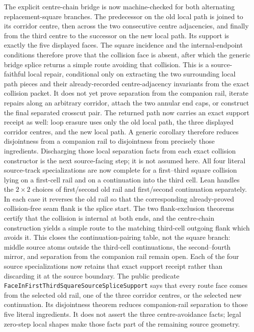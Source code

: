 \documentclass[11pt]{article}
\theoremstyle{definition}
\begin{document}
The explicit centre-chain bridge is now machine-checked for both alternating
replacement-square branches.  The predecessor on the old local path is joined
to its corridor centre, then across the two consecutive centre adjacencies,
and finally from the third centre to the successor on the new local path.  Its
support is exactly the five displayed faces.  The square incidence and the
internal-endpoint conditions therefore prove that the collision face is absent,
after which the generic bridge splice returns a simple route avoiding that
collision.  This is a source-faithful local repair, conditional only on
extracting the two surrounding local path pieces and their already-recorded
centre-adjacency invariants from the exact collision packet.  It does not yet
prove separation from the companion rail, iterate repairs along an arbitrary
corridor, attach the two annular end caps, or construct the final separated
crosscut pair.
The returned path now carries an exact support receipt as well: loop erasure
uses only the old local path, the three displayed corridor centres, and the new
local path.  A generic corollary therefore reduces disjointness from a companion
rail to disjointness from precisely those ingredients.  Discharging those
local separation facts from each exact collision constructor is the next
source-facing step; it is not assumed here.
All four literal source-track specializations are now complete for a
first--third square collision lying on a first-cell rail and on a continuation
into the third cell.  Lean handles the $2\times2$ choices of first/second old
rail and first/second continuation separately.  In each case it reverses the
old rail so that the corresponding already-proved collision-free seam flank is
the splice start.  The two flank-exclusion theorems certify that the collision
is internal at both ends, and the centre-chain construction yields a simple
route to the matching third-cell outgoing flank which avoids it.  This closes
the continuation-pairing table, not the square branch: middle source atoms
outside the third-cell continuations, the second--fourth mirror, and separation
from the companion rail remain open.
Each of the four source specializations now retains that exact support receipt
rather than discarding it at the source boundary.  The public predicate
\texttt{FaceInFirstThirdSquareSourceSpliceSupport} says that every route face
comes from the selected old rail, one of the three corridor centres, or the
selected new continuation.  Its disjointness theorem reduces companion-rail
separation to those five literal ingredients.  It does not assert the three
centre-avoidance facts; legal zero-step local shapes make those facts part of
the remaining source geometry.
\end{document}
